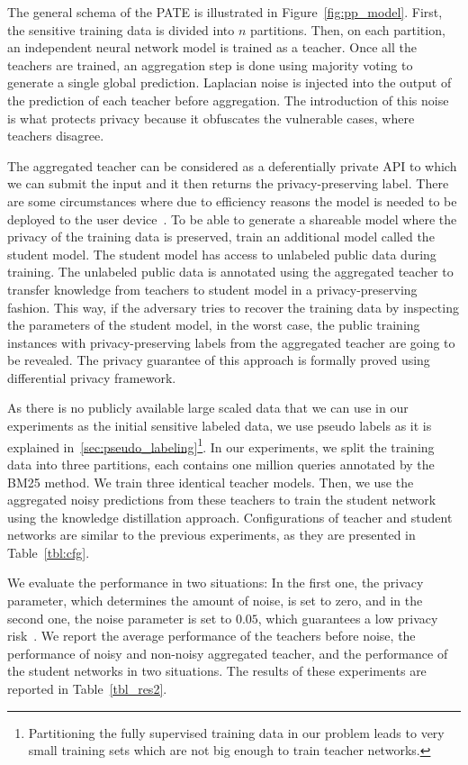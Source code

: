 The general schema of the PATE is illustrated in Figure~\ref{fig:pp_model}. First, the sensitive training data is divided into $n$ partitions. Then, on each partition, an independent neural network model is trained as a teacher.  Once all the teachers are trained, an aggregation step is done using majority voting to generate a single global prediction.  
Laplacian noise is injected into the output of the prediction of each teacher before aggregation. The introduction of this noise is what protects privacy because it obfuscates the vulnerable cases, where teachers disagree. 

The aggregated teacher can be considered as a deferentially private API to which we can submit the input and it then returns the privacy-preserving label. There are some circumstances where due to efficiency reasons the model is needed to be deployed to the user device~\cite{Abadi:2016}. To be able to generate a shareable model where the privacy of the training data is preserved, \citet{Papernot:2017} train an additional model called the student model. The student model has access to unlabeled public data during training. The unlabeled public data is annotated using the aggregated teacher to transfer knowledge from teachers to student model in a privacy-preserving fashion. 
This way, if the adversary tries to recover the training data by inspecting the parameters of the student model, in the worst case, the public training instances with privacy-preserving labels from the aggregated teacher are going to be revealed.  The privacy guarantee of this approach is formally proved using differential privacy framework.

As there is no publicly available large scaled data that we can use in our experiments as the initial sensitive labeled data, we use pseudo labels as it is explained in~\ref{sec:pseudo_labeling}\footnote{Partitioning the fully supervised training data in our problem leads to very small training sets which are not big enough to train teacher networks.}. 
In our experiments, we split the training data into three partitions, each contains one million queries annotated by the BM25 method. We train three identical teacher models. Then, we use the aggregated noisy predictions from these teachers to train the student network using the knowledge distillation approach. Configurations of teacher and student networks are similar to the previous experiments, as they are presented in Table~\ref{tbl:cfg}.

We evaluate the performance in two situations: In the first one, the privacy parameter, which determines the amount of noise, is set to zero, and in the second one, the noise parameter is set to $0.05$, which guarantees a low privacy risk~\citep{Papernot:2017}.
%
We report the average performance of the teachers before noise, the performance of noisy and non-noisy aggregated teacher, and the performance of the student networks in two situations.  The results of these experiments are reported in Table~\ref{tbl_res2}.

